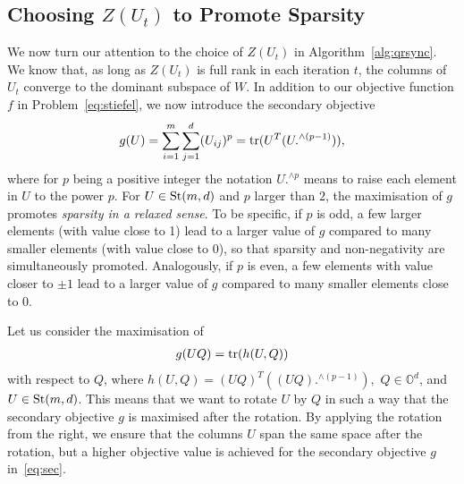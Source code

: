 \documentclass{article}
\begin{document}
\subsection{Choosing $Z(U_t)$ to Promote Sparsity}\label{sec:choosingZ}

%
%

We now turn our attention to the choice of $Z(U_t)$ in  Algorithm~\ref{alg:qrsync}. We know that, as long as $Z(U_t)$ is full rank in each iteration $t$, the columns of $U_t$ converge to the dominant subspace of $W$. In addition to our objective function $f$ in Problem~\eqref{eq:stiefel}, we now introduce the secondary objective
\begin{align}\label{eq:sec}
    g(U) = \sum_{i=1}^m \sum_{j=1}^d (U_{ij})^p =  \operatorname{tr}(U^T(U.^{\wedge (p-1)})),
\end{align}
where for $p$ being a positive integer the notation $U.^{\wedge p}$ means to raise each element in $U$ to the power $p$. For $U \in \operatorname{St}(m,d)$ and $p$ larger than $2$, the maximisation of $g$ promotes \emph{sparsity in a relaxed sense}. To be specific, if $p$ is odd,  a few larger elements (with value close to 1) lead to a larger value of $g$ compared to many smaller elements (with value close to 0), so that sparsity and non-negativity are simultaneously promoted. Analogously, if $p$ is even, a few elements with value closer to $\pm 1$ lead to a larger value of $g$ compared to many smaller elements close to $0$.




Let us consider the maximisation of 
\begin{align}
    g(UQ) = \operatorname{tr}(h(U,Q))
\end{align}
with respect to $Q$, where 
$h(U,Q) = (UQ)^T((UQ).^{\wedge (p-1)}),$
$Q \in \mathbb{O}^d$, and $U \in \operatorname{St}(m,d)$. This means that we want to rotate $U$ by $Q$ in such a way that the secondary objective $g$ is maximised after the rotation. By applying the rotation from the right, we ensure that the columns $U$ span the same space after the rotation, but a higher objective value is achieved for the secondary objective $g$ in~\eqref{eq:sec}.
\end{document}
